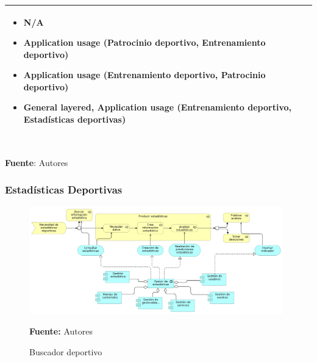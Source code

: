 \begin{table}[!htb]
\begin{center}
{\begin{tabular}{|p{7cm}|p{4cm}|}
\begin{itemize}
				\item N/A
				\item Application usage (Patrocinio deportivo, Entrenamiento deportivo)
				\item Application usage (Entrenamiento deportivo, Patrocinio deportivo)
				\item General layered, Application usage (Entrenamiento deportivo, Estadísticas deportivas)
			\end{itemize}
			\\
			\hline
		\end{tabular}
		} \\
		\textbf{Fuente}: Autores
	\end{center}
\end{table}

\subsubsection{Estadísticas Deportivas}

\begin{figure}[!htb]
  \begin{center}
    \includegraphics[width=11cm]{./imagenes/application_usage/estadisticasdeportivas.png}
    \caption{Buscador deportivo}
    \label{fig:BF_BuscadorDeportivo}
    \textbf{Fuente:}  Autores
  \end{center}
\end{figure}


